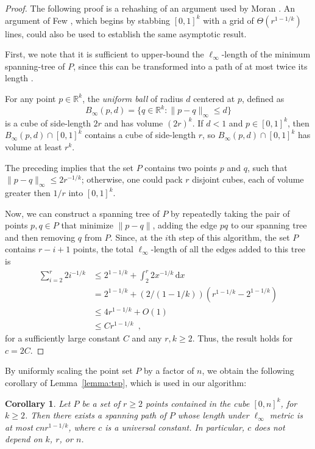 \documentclass[11pt]{patmorin}
\newtheorem{corollary}[theorem]{Corollary}
\newcommand{\R}{\mathbb{R}}
\begin{document}
\begin{proof}
The following proof is a rehashing of an argument used by Moran
\cite{moran:on}. An argument of Few \cite{few:shortest}, which begins
by stabbing $[0,1]^k$ with a grid of $\Theta(r^{1-1/k})$ lines, could
also be used to establish the same asymptotic result.

First, we note that it is sufficient to upper-bound the $\ell_\infty$-length of the minimum spanning-tree of $P$, since this
can be transformed into a path of at most twice its length \cite{rosenkrantz.stearns.ea:analysis}.

For any point $p\in\R^k$, the \emph{uniform ball} of radius $d$ centered at $p$,
defined as
\[
    B_\infty(p,d)=\{q\in\R^k : \|p-q\|_\infty \le d\}
\]
is a cube of side-length $2r$ and has volume $(2r)^k$.  If $d< 1$ and
$p\in [0,1]^k$, then $B_\infty(p,d)\cap [0,1]^k$ contains a cube of side-length $r$, so $B_\infty(p,d)\cap [0,1]^k$ has volume at least $r^k$.  

The preceding implies that the set $P$ contains two points $p$ and $q$,
such that $\|p-q\|_\infty \le 2r^{-1/k}$; otherwise, one could pack $r$
disjoint cubes, each of volume greater then $1/r$ into $[0,1]^k$.

Now, we can construct a spanning tree of $P$ by repeatedly taking the
pair of points $p,q\in P$ that minimize $\|p-q\|$, adding the edge $pq$
to our spanning tree and then removing $q$ from $P$. Since, at the $i$th
step of this algorithm, the set $P$ contains $r-i+1$ points, the total $\ell_\infty$-length of all the edges added to this tree is
\begin{align*}
   \sum_{i=2}^{r} 2i^{-1/k} 
     & \le 2^{1-1/k} + \int_2^r 2x^{-1/k}\,\mathrm{d}x \\
     & = 2^{1-1/k} + (2/(1-1/k))\left(r^{1-1/k}-2^{1-1/k}\right) \\
     & \le 4r^{1-1/k} + O(1) \\
     & \le Cr^{1-1/k} \enspace ,
\end{align*}
for a sufficiently large constant $C$ and any $r,k\ge 2$. Thus, the result holds for $c=2C$.
\end{proof}

By uniformly scaling the point set $P$ by a factor of $n$, we obtain the following corollary of Lemma~\ref{lemma:tsp}, which is used in our algorithm:

\begin{corollary}\label{cor:tsp}
  Let $P$ be a set of $r\ge 2$ points contained in the cube $[0,n]^k$,
  for $k\ge 2$.  Then there exists a spanning path of
  $P$ whose length under $\ell_\infty$ metric is at
  most $cnr^{1-1/k}$, where $c$ is a universal constant. In particular,
  $c$ does not depend on $k$, $r$, or $n$.
\end{corollary}
\end{document}
